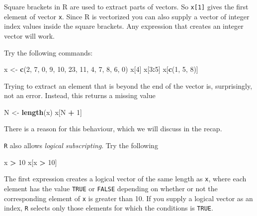 \documentclass[
]{book}
\newenvironment{Shaded}{\begin{snugshade}}{\end{snugshade}}
\newcommand{\DecValTok}[1]{\textcolor[rgb]{0.00,0.00,0.81}{#1}}
\newcommand{\FunctionTok}[1]{\textcolor[rgb]{0.13,0.29,0.53}{\textbf{#1}}}
\newcommand{\NormalTok}[1]{#1}
\newcommand{\OtherTok}[1]{\textcolor[rgb]{0.56,0.35,0.01}{#1}}
\newcommand{\SpecialCharTok}[1]{\textcolor[rgb]{0.81,0.36,0.00}{\textbf{#1}}}
\begin{document}
Square brackets in R are used to extract parts of vectors. So
\texttt{x{[}1{]}} gives the first element of vector \texttt{x}. Since R is
vectorized you can also supply a vector of integer index values inside
the square brackets. Any expression that creates an integer vector
will work.

Try the following commands:

\begin{Shaded}
\begin{Highlighting}[]
\NormalTok{x }\OtherTok{\textless{}{-}} \FunctionTok{c}\NormalTok{(}\DecValTok{2}\NormalTok{, }\DecValTok{7}\NormalTok{, }\DecValTok{0}\NormalTok{, }\DecValTok{9}\NormalTok{, }\DecValTok{10}\NormalTok{, }\DecValTok{23}\NormalTok{, }\DecValTok{11}\NormalTok{, }\DecValTok{4}\NormalTok{, }\DecValTok{7}\NormalTok{, }\DecValTok{8}\NormalTok{, }\DecValTok{6}\NormalTok{, }\DecValTok{0}\NormalTok{)}
\NormalTok{x[}\DecValTok{4}\NormalTok{]}
\NormalTok{x[}\DecValTok{3}\SpecialCharTok{:}\DecValTok{5}\NormalTok{]}
\NormalTok{x[}\FunctionTok{c}\NormalTok{(}\DecValTok{1}\NormalTok{, }\DecValTok{5}\NormalTok{, }\DecValTok{8}\NormalTok{)]}
\end{Highlighting}
\end{Shaded}

Trying to extract an element that is beyond the end of the vector is,
surprisingly, not an error. Instead, this returns a missing value

\begin{Shaded}
\begin{Highlighting}[]
\NormalTok{N }\OtherTok{\textless{}{-}} \FunctionTok{length}\NormalTok{(x)}
\NormalTok{x[N }\SpecialCharTok{+} \DecValTok{1}\NormalTok{]}
\end{Highlighting}
\end{Shaded}

There is a reason for this behaviour, which we will discuss in the recap.

\texttt{R} also allows \emph{logical subscripting}. Try the following

\begin{Shaded}
\begin{Highlighting}[]
\NormalTok{x }\SpecialCharTok{\textgreater{}} \DecValTok{10}
\NormalTok{x[x }\SpecialCharTok{\textgreater{}} \DecValTok{10}\NormalTok{]}
\end{Highlighting}
\end{Shaded}

The first expression creates a logical vector of the same length as
\texttt{x}, where each element has the value \texttt{TRUE} or
\texttt{FALSE} depending on whether or not the corresponding element
of \texttt{x} is greater than 10. If you supply a logical vector as an
index, \texttt{R} selects only those elements for which the conditions is
\texttt{TRUE}.
\end{document}
